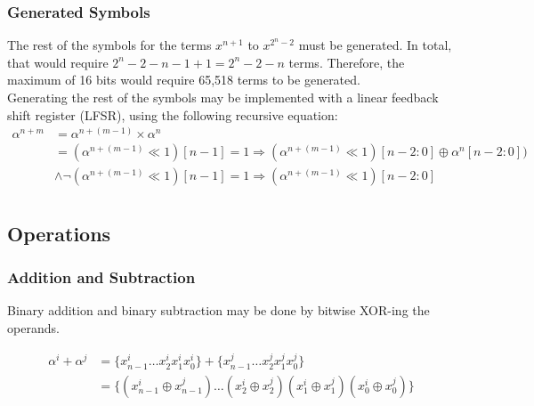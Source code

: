 \documentclass[paper=usletter, fontsize=12pt]{article}
\begin{document}
            \subsubsection{Generated Symbols}
            The rest of the symbols for the terms $x^{n+1}$ to $x^{2^{n}-2}$ must be generated. In total, that would require $2^{n}-2-n-1+1=2^{n}-2-n$ terms. Therefore, the maximum of 16 bits would require 65,518 terms to be generated. \\
            Generating the rest of the symbols may be implemented with a linear feedback shift register (LFSR), using the following recursive equation: \\

                \begin{equation*}
                    \begin{split}
                        \alpha^{n+m} & =\alpha^{n+(m-1)}\times \alpha^{n} \\
                        & = (\alpha^{n+(m-1)} \ll 1 )[n-1] = 1 \Longrightarrow ( \alpha^{n+(m-1)} \ll 1 )[n-2:0] \oplus \alpha^{n}[n-2:0]) \\
                        & \wedge \neg (\alpha^{n+(m-1)} \ll 1 )[n-1] = 1 \Longrightarrow ( \alpha^{n+(m-1)} \ll 1 )[n-2:0] \\
                    \end{split}
                \end{equation*}

            \newpage

        \subsection{Operations}

            \subsubsection{Addition and Subtraction}

            Binary addition and binary subtraction may be done by bitwise XOR-ing the operands.

                \begin{equation*}
                    \begin{split}
                        \alpha^{i} + \alpha^{j} & = \{x^{i}_{n-1}\ldots x^{i}_{2}x^{i}_{1}x^{i}_{0}\} + \{x^{j}_{n-1}\ldots x^{j}_{2}x^{j}_{1}x^{j}_{0}\} \\
                        & = \{(x^{i}_{n-1} \oplus x^{j}_{n-1})\ldots (x^{i}_{2}\oplus x^{j}_{2})(x^{i}_{1}\oplus x^{j}_{1})(x^{i}_{0}\oplus x^{j}_{0})\} \\
                    \end{split}
                \end{equation*}
\end{document}
